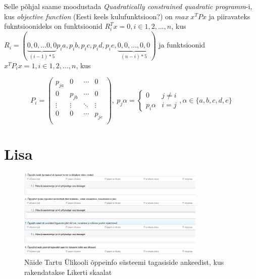 \documentclass[a4paper]{article}
\begin{document}
Selle põhjal saame moodustada \textit{Quadratically constrained quadratic programm}-i, kus \textit{objective function} {\color{cyan} (Eesti keels kulufunktsioon?)} on $max ~ x^TPx$ ja piiravateks fukntsioonideks on funktsioonid $R_i^Tx = 0,  i \in {1,2,...,n}$, kus $R_i = (\underbrace{0,0,...0,0}_{(i-1)*5}p_ia,p_ib,p_ic,p_id,p_ie,\underbrace{0,0,...,0,0}_{(n-i)*5})$ ja funktsioonid $x^TP_ix = 1, i \in {1,2,...,n}$, kus 

\begin{equation*}
P_i =
\begin{pmatrix}
p_{ja}&0&\cdots &0 \\
0&p_{jb}&\cdots &0 \\
\vdots & \vdots & \ddots & \vdots \\
0&0&\cdots & p_{je} \\
\end{pmatrix}
,~p_j\alpha =
\begin{cases} 
0 &  j \neq i \\ 
p_i\alpha & i = j 
\end{cases}
, \alpha \in \{a,b,c,d,e\}
\end{equation*}


\pagebreak
\section{Lisa}

\begin{figure}[H]
\centering
\includegraphics[width=0.8\textwidth]{ois_tagasiside_toodeldud.png}
\caption{Näide Tartu \"Ulikooli õppeinfo s\"usteemi tagasiside ankeedist, kus rakendatakse Likerti skaalat \cite{UT}}
\label{likert1}
\end{figure}
\end{document}
